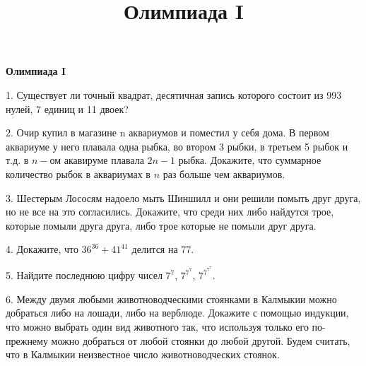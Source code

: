 \centerline{\bf \Huge Олимпиада I}
\title{Олимпиада I}

1. Существует ли точный квадрат, десятичная запись которого состоит из 993 нулей, 7 единиц и 11 двоек?

2. Очир купил в магазине n аквариумов и поместил у себя дома. В первом аквариуме у него плавала одна рыбка, во втором 3 рыбки, в третьем 5 рыбок и т.д. в $n-$ом акавируме плавала $2n-1$ рыбка. Докажите, что суммарное количество рыбок в аквариумах в $n$ раз больше чем аквариумов.

3. Шестерым Лососям надоело мыть Шиншилл и они решили помыть друг друга, но не все на это согласились. Докажите, что среди них либо найдутся трое, которые помыли друга друга, либо трое которые не помыли друг друга. 

4. Докажите, что $36^{36} + 41^{41}$ делится на $77$.

5. Найдите последнюю цифру чисел $7^{7}$, $7^{7^{7}}$, $7^{7^{7^{7}}}$.

6. Между двумя любыми животноводческими стоянками в Калмыкии можно добраться либо на лошади, либо на верблюде. Докажите с помощью индукции, что можно выбрать один вид животного так, что используя только его по-прежнему можно добраться от любой стоянки до любой другой. Будем считать, что в Калмыкии неизвестное число животноводческих стоянок.